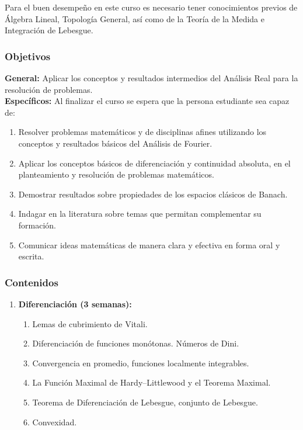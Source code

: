 \begin{refsection}
Para el buen desempeño en este curso es necesario tener conocimientos previos de Álgebra Lineal, Topología General, así como de la Teoría de la Medida e Integración de Lebesgue. 



\subsubsection*{Objetivos}

\textbf{General:} Aplicar los conceptos y resultados intermedios del Análisis Real para la resolución de problemas. \\

\textbf{Específicos:} Al finalizar el curso se espera que la persona estudiante sea capaz de:

\begin{enumerate}
\item Resolver problemas matemáticos y de disciplinas afines utilizando los conceptos y resultados básicos del Análisis de Fourier.
\item Aplicar los conceptos b\'asicos de diferenciación y continuidad absoluta, en el planteamiento y resoluci\'on de problemas matem\'aticos.
\item Demostrar resultados sobre propiedades de los espacios clásicos de Banach.
\item Indagar en la literatura sobre temas que permitan complementar su formación.
\item Comunicar ideas matemáticas de manera clara y efectiva en forma oral y escrita.
\end{enumerate}

\subsubsection*{Contenidos}

\begin{enumerate}
\item \textbf{Diferenciación (3 semanas):} 
\begin{enumerate}
    \item Lemas de cubrimiento de Vitali.
    \item Diferenciación de funciones monótonas. Números de Dini.
    \item Convergencia en promedio, funciones localmente integrables.
    \item La Función Maximal de Hardy--Littlewood y el Teorema Maximal.
    \item Teorema de Diferenciación de Lebesgue, conjunto de Lebesgue.
    \item Convexidad.
\end{enumerate}


\end{enumerate}
\end{refsection}
